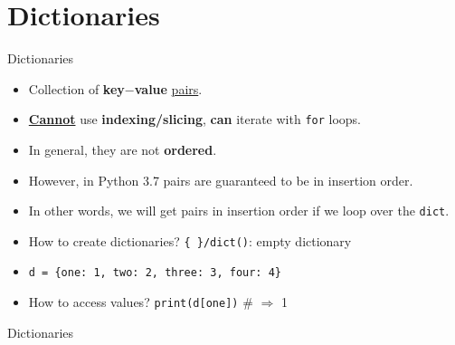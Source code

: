     \section{Dictionaries}
    \begin{frame}{Dictionaries}
        \LARGE
        \begin{itemize}
            \item Collection of \textbf{key$-$value} \underline{pairs}.
            \pause
            \item \underline{\textbf{Cannot}} use \textbf{indexing/slicing}, \textbf{can} iterate with \texttt{for} loops. 
            \pause
            \item In general, they are not \textbf{ordered}. 
            \pause
            \item However, in Python 3.7 pairs are guaranteed to be in insertion order.
            \pause
            \item In other words, we will get pairs in insertion order if we loop over the \texttt{dict}.
            \pause
            \item How to create dictionaries?
            \pause
             \texttt{\{\ \}/dict()}: empty dictionary
            \pause
            \item \texttt{d = \{\textquotesingle one\textquotesingle : 1, \textquotesingle two\textquotesingle : 2, \textquotesingle three\textquotesingle : 3, \textquotesingle four\textquotesingle : 4\}}
            \pause
            \item How to access values? 
            \pause
             \texttt{print(d[\textquotesingle one\textquotesingle ])} \# $\Rightarrow$ 1
        \end{itemize}
    \end{frame}

    \begin{frame}{Dictionaries}
        \large
        \inputminted[frame=single,framesep=2pt]{python3}{code-examples/dicts.py}
    \end{frame}

